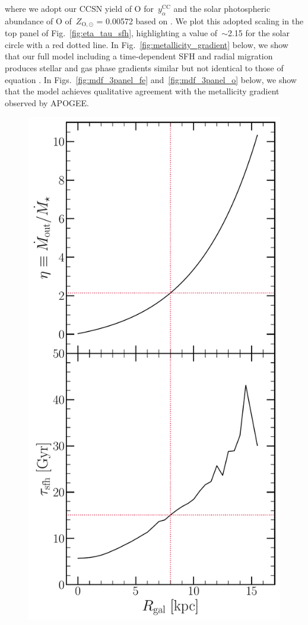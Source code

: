 \documentclass[draft2.tex]{subfiles}
\begin{document}
where we adopt our CCSN yield of O for~$y_\alpha^\text{CC}$ and the solar 
photospheric abundance of O of~$Z_{\text{O},\odot}$ = 0.00572 based on 
\citet{Asplund2009}. 
We plot this adopted scaling in the top panel of Fig.~\ref{fig:eta_tau_sfh}, 
highlighting a value of~$\sim$2.15 for the solar circle with a red dotted line. 
In Fig.~\ref{fig:metallicity_gradient} below, we show that our full model 
including a time-dependent SFH and radial migration produces stellar and gas 
phase gradients similar but not identical to those of equation 
. 
In Figs.~\ref{fig:mdf_3panel_fe} and~\ref{fig:mdf_3panel_o} below, we show that 
the model achieves qualitative agreement with the metallicity gradient observed 
by APOGEE. 

\begin{figure} 
\centering 
\includegraphics[scale = 0.45]{eta_tau_sfh.pdf} 

\end{figure}
\end{document}
